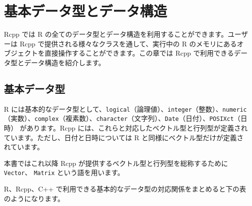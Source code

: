 \documentclass[]{book}
\newenvironment{Shaded}{\begin{snugshade}}{\end{snugshade}}
\newcommand{\CommentTok}[1]{\textcolor[rgb]{0.56,0.35,0.01}{\textit{#1}}}
\newcommand{\ControlFlowTok}[1]{\textcolor[rgb]{0.13,0.29,0.53}{\textbf{#1}}}
\newcommand{\DataTypeTok}[1]{\textcolor[rgb]{0.13,0.29,0.53}{#1}}
\newcommand{\DecValTok}[1]{\textcolor[rgb]{0.00,0.00,0.81}{#1}}
\newcommand{\NormalTok}[1]{#1}
\newcommand{\SpecialCharTok}[1]{\textcolor[rgb]{0.00,0.00,0.00}{#1}}
\newcommand{\StringTok}[1]{\textcolor[rgb]{0.31,0.60,0.02}{#1}}
\begin{document}
\begin{Shaded}
\end{Shaded}

\chapter{基本データ型とデータ構造}

Rcpp では R の全てのデータ型とデータ構造を利用することができます。ユーザーは Rcpp で提供される様々なクラスを通して、実行中の R のメモリにあるオブジェクトを直接操作することができます。この章では Rcpp で利用できるデータ型とデータ構造を紹介します。

\section{基本データ型}

R には基本的なデータ型として、\texttt{logical}（論理値）、\texttt{integer}（整数）、\texttt{numeric}（実数）、\texttt{complex}（複素数）、\texttt{character}（文字列）、\texttt{Date}（日付）、\texttt{POSIXct}（日時） があります。Rcpp には、これらと対応したベクトル型と行列型が定義されています。ただし、日付と日時については R と同様にベクトル型だけが定義されています。

本書ではこれ以降 Rcpp が提供するベクトル型と行列型を総称するために \texttt{Vector}、 \texttt{Matrix} という語を用います。

R、Rcpp、C++ で利用できる基本的なデータ型の対応関係をまとめると下の表のようになります。
\end{document}
